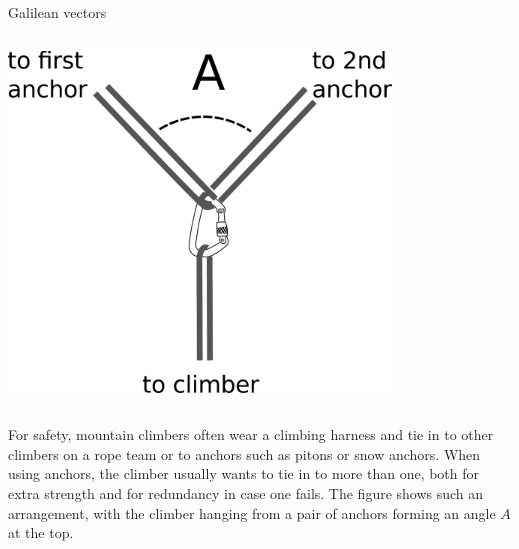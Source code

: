 \begin{frame}{Galilean vectors}


  \begin{mycolumns}

    \begin{column}{.4\textwidth}\includegraphics[width=4in]{ch04/figs/anchor-1}\end{column}

    \begin{column}{.6\textwidth}

For safety, mountain climbers often wear a climbing harness and tie in to other climbers on a rope
team or to anchors such as pitons or snow anchors. When using anchors, the climber usually wants to tie in
to more than one, both for extra strength and for redundancy in case one fails.
The figure shows such an arrangement, with the climber hanging from a pair of anchors forming an angle $A$
at the top.

    \end{column}
  \end{mycolumns}

\end{frame}


